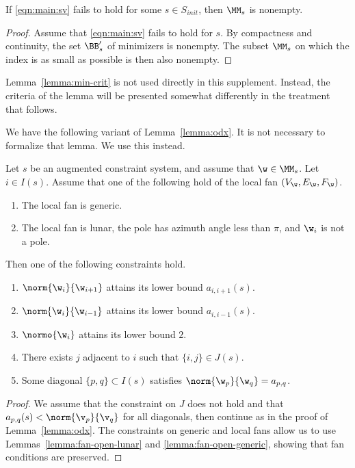 \begin{lemma}
If \eqref{eqn:main:sv} fails to hold for some $s\in S_{init}$, 
then $\MM_s$ is nonempty.
\end{lemma}

\begin{proof}  Assume that \eqref{eqn:main:sv} fails to hold for
$s$.  By compactness and continuity, the set 
$\BB'_s$ of minimizers is nonempty.   
The subset $\MM_s$ on which the index is as small as possible
is then also nonempty.
\end{proof}

Lemma~\ref{lemma:min-crit} is not used directly in this supplement.
Instead, the criteria of the lemma will be presented somewhat differently
in the treatment that follows.

We have the following variant of Lemma~\ref{lemma:odx}.
It is not necessary to formalize that lemma.  We use this instead.

\begin{lemma} Let $s$ be an augmented constraint system,
and assume that $\w\in \MM_s$.  Let $i\in I(s)$.
Assume  that one of the following hold of the local fan $(V_\w,E_\w,F_\w)$.
\begin{enumerate}
\item The local fan is generic.
\item The local fan is lunar, the pole has azimuth
angle less than $\pi$, and $\w_i$ is not a pole.  
\end{enumerate}
Then one of the following   constraints hold.
\begin{enumerate}
\item $\norm{\w_i}{\w_{i+1}}$ attains its lower bound $a_{i,i+1}(s)$.
\item $\norm{\w_i}{\w_{i-1}}$ attains its lower bound $a_{i,i-1}(s)$.
\item $\normo{\w_i}$ attains its lower bound $2$.
\item There exists $j$ adjacent to $i$ such that $\{i,j\}\in J(s)$.
\item Some diagonal $\{p,q\}\subset I(s)$ satisfies
$\norm{\w_p}{\w_q}=a_{p,q}$.
\end{enumerate}
\end{lemma}

\begin{proof} 
We assume that the constraint on $J$ does not hold and
that $a_{p,q}(s)<\norm{\v_p}{\v_q}$ for all diagonals, then continue as in the proof of
Lemma~\ref{lemma:odx}.  The constraints on generic and local fans
allow us to use Lemmas~\ref{lemma:fan-open-lunar} and
\ref{lemma:fan-open-generic}, showing that fan conditions are preserved.
\end{proof}

